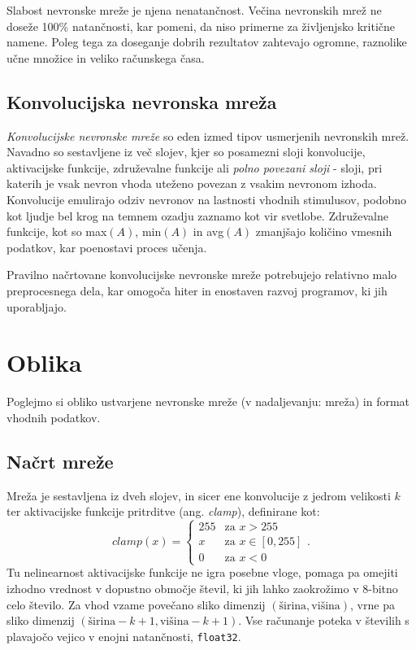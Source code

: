 \documentclass[a4paper,11pt]{article}
\begin{document}
Slabost nevronske mreže je njena nenatančnost.
Večina nevronskih mrež ne doseže 100\% natančnosti, kar pomeni, da niso primerne za življenjsko kritične namene.
Poleg tega za doseganje dobrih rezultatov zahtevajo ogromne, raznolike učne množice in veliko računskega časa.\cite{ann_compute}

\subsection{Konvolucijska nevronska mreža}

\emph{Konvolucijske nevronske mreže} so eden izmed tipov usmerjenih nevronskih mrež.
Navadno so sestavljene iz več slojev, kjer so posamezni sloji konvolucije, aktivacijske funkcije, združevalne funkcije ali
	\emph{polno povezani sloji} - sloji, pri katerih je vsak nevron vhoda uteženo povezan z vsakim nevronom izhoda.
Konvolucije emulirajo odziv nevronov na lastnosti vhodnih stimulusov, podobno kot ljudje bel krog na temnem ozadju zaznamo kot
	vir svetlobe.\cite{cnn_conv}
Združevalne funkcije, kot so max$(A)$, min$(A)$ in avg$(A)$ zmanjšajo količino vmesnih podatkov, kar poenostavi proces učenja.\cite{cnn_pool}

Pravilno načrtovane konvolucijske nevronske mreže potrebujejo relativno malo preprocesnega dela, kar omogoča hiter in enostaven razvoj programov,
	ki jih uporabljajo.

\section{Oblika}

Poglejmo si obliko ustvarjene nevronske mreže (v nadaljevanju: mreža) in format vhodnih podatkov.

\subsection{Načrt mreže}

Mreža je sestavljena iz dveh slojev, in sicer ene konvolucije z jedrom velikosti $k$ ter aktivacijske funkcije pritrditve (ang. \emph{clamp}),
	definirane kot:
\begin{equation*} 
clamp(x) = \begin{cases}
	255 & \text{za } x > 255 \\
	x & \text{za } x \in [0, 255] \\
	0 & \text{za } x < 0
\end{cases}.
\end{equation*}
Tu nelinearnost aktivacijske funkcije ne igra posebne vloge, pomaga pa omejiti izhodno vrednost v dopustno območje števil, ki jih lahko zaokrožimo v
	8-bitno celo število.
Za vhod vzame povečano sliko dimenzij $(\text{širina}, \text{višina})$, vrne pa sliko dimenzij $(\text{širina} - k + 1, \text{višina} - k + 1)$.
Vse računanje poteka v številih s plavajočo vejico v enojni natančnosti, \texttt{float32}.
\end{document}
